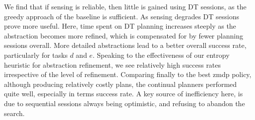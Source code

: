 We find that if sensing is reliable, then little is gained using DT
sessions, as the greedy approach of the baseline is
sufficient. As sensing degrades DT sessions prove more useful. Here,
time spent on DT planning increases steeply as the abstraction becomes
more refined, which is compensated for by fewer planning sessions
overall. More detailed abstractions lead to a better overall
success rate, particularly for tasks $d$ and $e$.
Speaking to the effectiveness of our entropy heuristic for abstraction
refinement, we see relatively high success rates irrespective of
the level of refinement. Comparing finally to the best {\sc
zmdp} policy, although producing relatively costly plans, the
continual planners performed quite well, especially in terms success
rate. A key source of inefficiency here, is due to sequential sessions
always being optimistic, and refusing to abandon the search.

